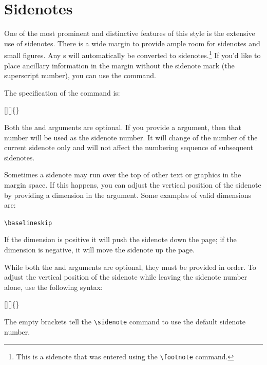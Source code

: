 \section{Sidenotes}\label{sec:sidenotes}
One of the most prominent and distinctive features of this style is the
extensive use of sidenotes.  There is a wide margin to provide ample room
for sidenotes and small figures.  Any s will automatically
be converted to sidenotes.\footnote{This is a sidenote that was entered
using the \texttt{\textbackslash footnote} command.}  If you'd like to place ancillary
information in the margin without the sidenote mark (the superscript
number), you can use the  command.

The specification of the  command is:
\begin{docspec}
  [][]\{\}
\end{docspec}

Both the  and  arguments are optional.  If you
provide a  argument, then that number will be used as the
sidenote number.  It will change of the number of the current sidenote only and
will not affect the numbering sequence of subsequent sidenotes.

Sometimes a sidenote may run over the top of other text or graphics in the
margin space.  If this happens, you can adjust the vertical position of the
sidenote by providing a dimension in the  argument.  Some
examples of valid dimensions are:
\begin{docspec}
  \ttfamily 1.0in \qquad 2.54cm \qquad 254mm \Verb|\baselineskip|
\end{docspec}
If the dimension is positive it will push the sidenote down the page; if the
dimension is negative, it will move the sidenote up the page.

While both the  and  arguments are optional, they
must be provided in order.  To adjust the vertical position of the sidenote
while leaving the sidenote number alone, use the following syntax:
\begin{docspec}
  [][]\{\}
\end{docspec}
The empty brackets tell the \Verb|\sidenote| command to use the default
sidenote number.

